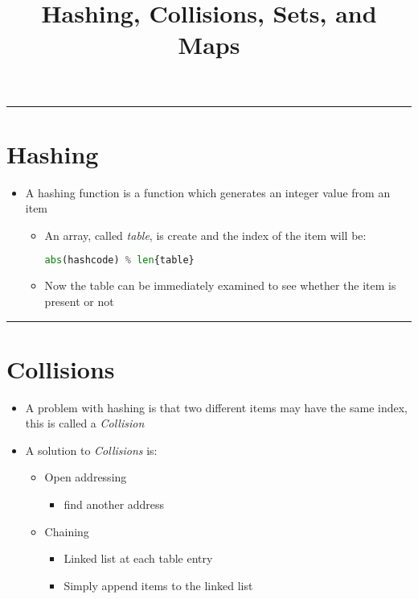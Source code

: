 \documentclass{article}
\title{Hashing, Collisions, Sets, and Maps}
\begin{document}
\maketitle

\begin{center}
  \rule{0.5\textwidth}{0.4pt}
\end{center}

\section{Hashing}
\begin{itemize}
  \item{A hashing function is a function which generates an integer value from an item}
  \begin{itemize}
    \item{An array, called \textit{table}, is create and the index of the item will be:}
    \begin{lstlisting}[language=Python]
    abs(hashcode) % len{table}
    \end{lstlisting}
    \item{Now the table can be immediately examined to see whether the item is present or not}
  \end{itemize}
\end{itemize}

\begin{center}
  \rule{0.5\textwidth}{0.4pt}
\end{center}

\section{Collisions}
\begin{itemize}
  \item{A problem with hashing is that two different items may have the same index, this is called a \textit{Collision}}
  \item{A solution to \textit{Collisions} is:}
  \begin{itemize}
    \item{Open addressing}
    \begin{itemize}
      \item{find another address}
    \end{itemize}
    \item{Chaining}
    \begin{itemize}
      \item{Linked list at each table entry}
      \item{Simply append items to the linked list}
    \end{itemize}
  \end{itemize}
\end{itemize}
\end{document}
